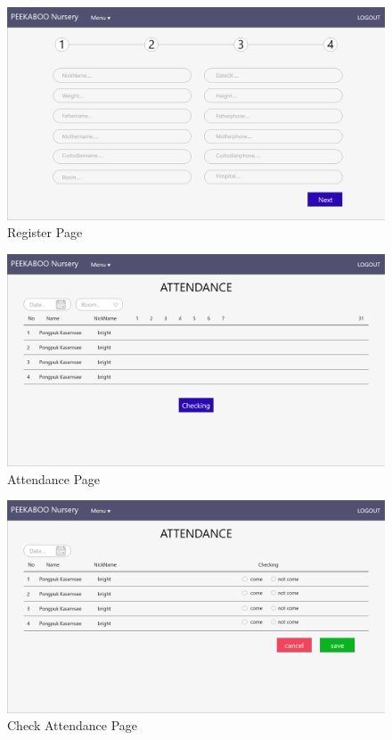 \begin{figure}
  \begin{center}
  \includegraphics[width=140mm]{images/registerPage.png}
  \end{center}
  \caption[Poem]{Register Page}
  \label{fig:walrus}
  \end{figure}

\begin{figure}
  \begin{center}
  \includegraphics[width=140mm]{images/AttendancePage.png}
  \end{center}
  \caption[Poem]{Attendance Page}
  \label{fig:walrus}
  \end{figure}

\begin{figure}
  \begin{center}
  \includegraphics[width=140mm]{images/AttendancePageChecking.png}
  \end{center}
  \caption[Poem]{Check Attendance Page}
  \label{fig:walrus}
  \end{figure}


